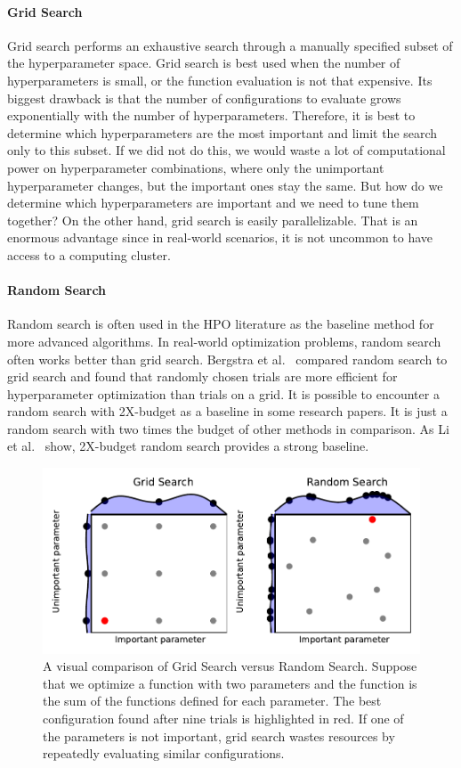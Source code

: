 \paragraph{Grid Search} Grid search performs an exhaustive search through a manually specified subset of the hyperparameter space. Grid search is best used when the number of hyperparameters is small, or the function evaluation is not that expensive. Its biggest drawback is that the number of configurations to evaluate grows exponentially with the number of hyperparameters. Therefore, it is best to determine which hyperparameters are the most important and limit the search only to this subset. If we did not do this, we would waste a lot of computational power on hyperparameter combinations, where only the unimportant hyperparameter changes, but the important ones stay the same. But how do we determine which hyperparameters are important and we need to tune them together? On the other hand, grid search is easily parallelizable. That is an enormous advantage since in real-world scenarios, it is not uncommon to have access to a computing cluster.

\paragraph{Random Search} Random search is often used in the HPO literature as the baseline method for more advanced algorithms. In real-world optimization problems, random search often works better than grid search. Bergstra et al.~\cite{bergstra2012random} compared random search to grid search and found that randomly chosen trials are more efficient for hyperparameter optimization than trials on a grid. It is possible to encounter a random search with 2X-budget as a baseline in some research papers. It is just a random search with two times the budget of other methods in comparison. As Li et al.~\cite{li2018hyperband} show, 2X-budget random search provides a strong baseline.

\begin{figure}[H]
    \centering
    \includegraphics[scale=0.8]{img/grid_vs_rs.pdf}
    \caption{A visual comparison of Grid Search versus Random Search. Suppose that we optimize a function with two parameters and the function is the sum of the functions defined for each parameter. The best configuration found after nine trials is highlighted in red. If one of the parameters is not important, grid search wastes resources by repeatedly evaluating similar configurations. }
    \label{fig:grid}
\end{figure}

